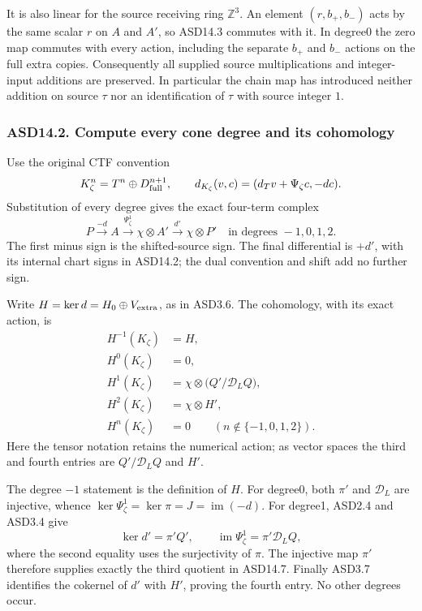 It is also linear for the source receiving ring \(\mathbb Z^3\). An
element \((r,b_+,b_-)\) acts by the same scalar \(r\) on \(A\) and
\(A'\), so ASD14.3 commutes with it. In degree0 the zero map commutes
with every action, including the separate \(b_+\) and \(b_-\) actions on
the full extra copies. Consequently all supplied source multiplications
and integer-input additions are preserved. In particular the chain map
has introduced neither addition on source \(\tau\) nor an identification
of \(\tau\) with source integer \(1\).

\subsubsection{ASD14.2. Compute every cone degree and its
cohomology}\label{asd14.2.-compute-every-cone-degree-and-its-cohomology}

Use the original CTF convention \[
 K_\zeta^n=T^n\oplus D_{\rm full}^{n+1},\qquad
 d_{K_\zeta}(v,c)=(d_Tv+\Psi_\zeta c,-dc).
\] Substitution of every degree gives the exact four-term complex \[
 \boxed{
 P\xrightarrow{-d}A
   \xrightarrow{\Psi_\zeta^1}\chi\otimes A'
   \xrightarrow{d'}\chi\otimes P'
 }
 \quad\text{in degrees }-1,0,1,2.
 \tag{ASD14.6}
\] The first minus sign is the shifted-source sign. The final
differential is \(+d'\), with its internal chart signs in ASD14.2; the
dual convention and shift add no further sign.

Write \(H=\ker d=H_0\oplus V_{\rm extra}\), as in ASD3.6. The
cohomology, with its exact action, is \[
 \boxed{
 \begin{aligned}
 H^{-1}(K_\zeta)&=H,\\
 H^0(K_\zeta)&=0,\\
 H^1(K_\zeta)&=\chi\otimes\bigl(Q'/\mathcal D_LQ\bigr),\\
 H^2(K_\zeta)&=\chi\otimes H',\\
 H^n(K_\zeta)&=0\qquad(n\notin\{-1,0,1,2\}).
 \end{aligned}}
 \tag{ASD14.7}
\] Here the tensor notation retains the numerical action; as vector
spaces the third and fourth entries are \(Q'/\mathcal D_LQ\) and \(H'\).

The degree \(-1\) statement is the definition of \(H\). For degree0,
both \(\pi'\) and \(\mathcal D_L\) are injective, whence
\(\ker\Psi_\zeta^1=\ker\pi=J=\operatorname{im}(-d)\). For degree1,
ASD2.4 and ASD3.4 give \[
 \ker d'=\pi'Q',\qquad
 \operatorname{im}\Psi_\zeta^1=\pi'\mathcal D_LQ,
\] where the second equality uses the surjectivity of \(\pi\). The
injective map \(\pi'\) therefore supplies exactly the third quotient in
ASD14.7. Finally ASD3.7 identifies the cokernel of \(d'\) with \(H'\),
proving the fourth entry. No other degrees occur.

